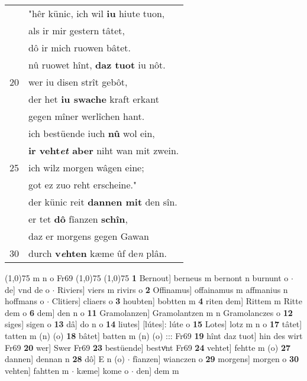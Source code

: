\documentclass[8pt,a4paper,notitlepage]{article}
\begin{document}
\begin{table}[ht]
\begin{minipage}[t]{0.5\linewidth}
\begin{tabular}{rl}
 & "hêr künic, ich wil \textbf{iu} hiute tuon,\\ 
 & als ir mir gestern tâtet,\\ 
 & dô ir mich ruowen bâtet.\\ 
 & nû ruowet hînt, \textbf{daz tuot} iu nôt.\\ 
20 & wer iu disen strît gebôt,\\ 
 & der het \textbf{iu swache} kraft erkant\\ 
 & gegen mîner werlîchen hant.\\ 
 & ich bestüende iuch \textbf{nû} wol ein,\\ 
 & \textbf{ir veht\textit{et} aber} niht wan mit zwein.\\ 
25 & ich wilz morgen wâgen eine;\\ 
 & got ez zuo reht erscheine."\\ 
 & der künic reit \textbf{dannen mit} den sîn.\\ 
 & er tet \textbf{dô} fîanzen \textbf{schîn},\\ 
 & daz er morgens gegen Gawan\\ 
30 & durch \textbf{v\textit{e}hten} kæme ûf de\textit{n} plân.\\ 
\end{tabular}
\scriptsize
\line(1,0){75} \newline
m n o Fr69 \newline
\line(1,0){75} \newline
\newline
\line(1,0){75} \newline
\textbf{1} Bernout] berneus m bernont n burnunt o  $\cdot$ de] vnd de o  $\cdot$ Riviers] viers m rivirs o \textbf{2} Offinamus] offainamus m affmanius n hoffmans o  $\cdot$ Clitiers] cliaers o \textbf{3} houbten] bobtten m \textbf{4} riten dem] Rittem m Ritte dem o \textbf{6} dem] den n o \textbf{11} Gramolanzen] Gramolantzen m n Gramolanczes o \textbf{12} siges] sigen o \textbf{13} dâ] do n o \textbf{14} liutes] [lútes]: lúte o \textbf{15} Lotes] lotz m n o \textbf{17} tâtet] tatten m (n) (o) \textbf{18} bâtet] batten m (n) (o) ::: Fr69 \textbf{19} hînt daz tuot] hin des wirt Fr69 \textbf{20} wer] Swer Fr69 \textbf{23} bestüende] bestvͦnt Fr69 \textbf{24} vehtet] fehtte m (o) \textbf{27} dannen] dennan n \textbf{28} dô] E n (o)  $\cdot$ fîanzen] wianczen o \textbf{29} morgens] morgen o \textbf{30} vehten] fahtten m  $\cdot$ kæme] kome o  $\cdot$ den] dem m \newline
\end{minipage}
\end{table}
\end{document}
